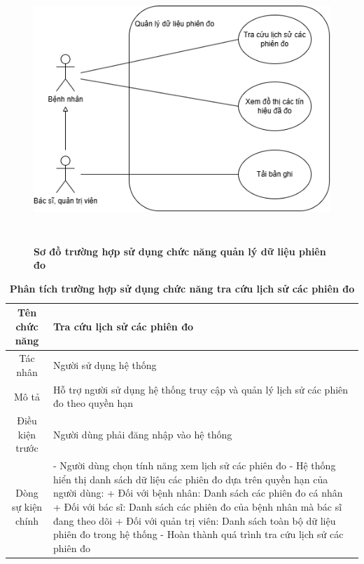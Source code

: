 \begin{figure}[H]
	\centering
	\includegraphics[width=12cm,height=10cm]{Images/use_case/use_case_record.png}
	\caption[Sơ đồ trường hợp sử dụng chức năng quản lý dữ liệu phiên đo]{\bfseries \fontsize{12pt}{0pt}
		\selectfont Sơ đồ trường hợp sử dụng chức năng quản lý dữ liệu phiên đo}
	\label{use_case_record} %
\end{figure}

\begin{table}[H]
	\caption{\bfseries \fontsize{12pt}{0pt}\selectfont Phân tích trường hợp sử dụng chức năng tra cứu lịch sử các phiên đo}
	\centering
	\begin{tabularx}{0.9\textwidth}{|c|X|}
		\hline
		\textbf{Tên chức năng} & \textbf{Tra cứu lịch sử các phiên đo}                                                 \\
		\hline
		Tác nhân               & Người sử dụng hệ thống                                                                \\
		\hline
		Mô tả                  & Hỗ trợ người sử dụng hệ thống truy cập và quản lý lịch sử các phiên đo theo quyền hạn \\
		\hline
		Điều kiện trước        & Người dùng phải đăng nhập vào hệ thống                                                \\
		\hline
		Dòng sự kiện chính     &
		- Người dùng chọn tính năng xem lịch sử các phiên đo \newline
		- Hệ thống hiển thị danh sách dữ liệu các phiên đo dựa trên quyền hạn của người dùng: \newline
		+ Đối với bệnh nhân: Danh sách các phiên đo cá nhân \newline
		+ Đối với bác sĩ: Danh sách các phiên đo của bệnh nhân mà bác sĩ đang theo dõi \newline
		+ Đối với quản trị viên: Danh sách toàn bộ dữ liệu phiên đo trong hệ thống \newline
		- Hoàn thành quá trình tra cứu lịch sử các phiên đo                                                            \\
		\hline
	\end{tabularx}
\end{table}

